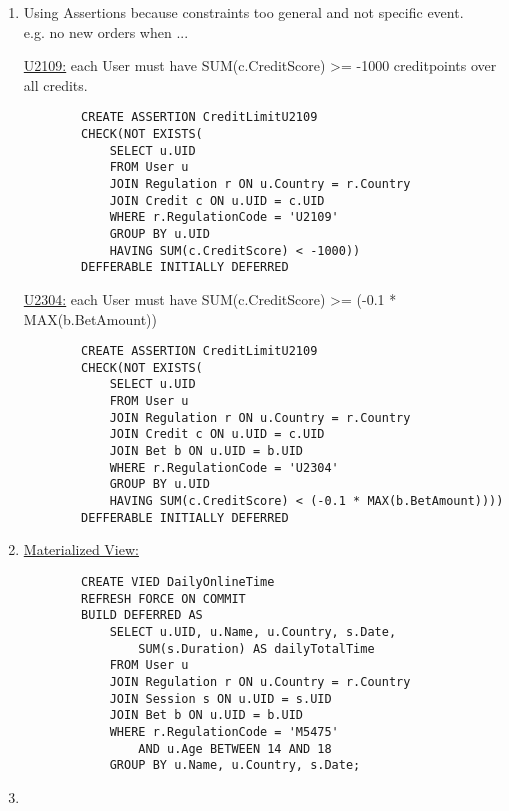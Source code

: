 \documentclass{article}
\begin{document}
\begin{enumerate}[label=\alph*)]
    \item Using Assertions because constraints too general and not specific event. \\ e.g. no new orders when ...
        
        \underline{U2109:} each User must have SUM(c.CreditScore) >= -1000 creditpoints over all credits. 


        \begin{verbatim}
        CREATE ASSERTION CreditLimitU2109
        CHECK(NOT EXISTS(
            SELECT u.UID
            FROM User u
            JOIN Regulation r ON u.Country = r.Country
            JOIN Credit c ON u.UID = c.UID
            WHERE r.RegulationCode = 'U2109'
            GROUP BY u.UID
            HAVING SUM(c.CreditScore) < -1000))
        DEFFERABLE INITIALLY DEFERRED
        \end{verbatim}

        \underline{U2304:} each User must have SUM(c.CreditScore) >= (-0.1 * MAX(b.BetAmount))

        \begin{verbatim}
        CREATE ASSERTION CreditLimitU2109
        CHECK(NOT EXISTS(
            SELECT u.UID
            FROM User u
            JOIN Regulation r ON u.Country = r.Country
            JOIN Credit c ON u.UID = c.UID
            JOIN Bet b ON u.UID = b.UID
            WHERE r.RegulationCode = 'U2304'
            GROUP BY u.UID
            HAVING SUM(c.CreditScore) < (-0.1 * MAX(b.BetAmount))))
        DEFFERABLE INITIALLY DEFERRED
        \end{verbatim}

    \item \underline{Materialized View:}
    
    \begin{verbatim}
        CREATE VIED DailyOnlineTime
        REFRESH FORCE ON COMMIT 
        BUILD DEFERRED AS
            SELECT u.UID, u.Name, u.Country, s.Date, 
                SUM(s.Duration) AS dailyTotalTime
            FROM User u
            JOIN Regulation r ON u.Country = r.Country
            JOIN Session s ON u.UID = s.UID
            JOIN Bet b ON u.UID = b.UID
            WHERE r.RegulationCode = 'M5475' 
                AND u.Age BETWEEN 14 AND 18
            GROUP BY u.Name, u.Country, s.Date;
        \end{verbatim}

    \item

    \end{enumerate}
\end{document}
